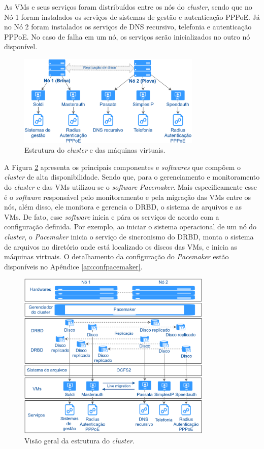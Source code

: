 As \acp{VM} e seus serviços foram distribuídos entre os nós do \textit{cluster}, sendo que no Nó 1 foram instalados os serviços de sistemas 
de gestão e autenticação \ac{PPPoE}. Já no Nó 2 foram instalados os serviços de \ac{DNS} recursivo, telefonia e autenticação \ac{PPPoE}.
No caso de falha em um nó, os serviços serão inicializados no outro nó disponível. 

\begin{figure}[h!]
 \centering
 \includegraphics[width=330px]{img/projeto_vms.eps}
 \caption{Estrutura do \textit{cluster} e das máquinas virtuais.}
 \label{fig:projeto_vms}
\end{figure}

A Figura \ref{fig:projeto_estrutura} apresenta os principais componentes e \textit{softwares} que compõem o \textit{cluster} de alta disponibilidade. 
Sendo que, para o gerenciamento e monitoramento do \textit{cluster} e das \acp{VM} utilizou-se o \textit{software} \textit{Pacemaker}. 
Mais especificamente esse é o \textit{software} responsável pelo monitoramento e pela migração das \acp{VM} entre os nós, além disso, ele 
monitora e gerencia o \ac{DRBD}, o sistema de arquivos e as \acp{VM}. De fato, esse \textit{software} inicia e pára os serviços de acordo 
com a configuração definida. Por exemplo, ao iniciar o sistema operacional de um nó do \textit{cluster}, o \textit{Pacemaker} inicia o serviço 
de sincronismo do \ac{DRBD}, monta o sistema de arquivos no diretório onde está localizado os discos das \acp{VM}, e inicia as máquinas virtuais. 
O detalhamento da configuração do \textit{Pacemaker} estão disponíveis no Apêndice \ref{ap:confpacemaker}.

\begin{figure}[h!]
 \centering
 \includegraphics[width=350px]{img/projeto_estrutura.eps}
 \caption{Visão geral da estrutura do \textit{cluster}.}
 \label{fig:projeto_estrutura}
\end{figure}

